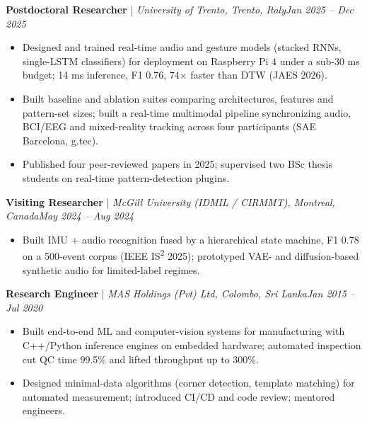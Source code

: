 \documentclass[11pt]{article}
\newenvironment{cvrole}[5]{%
  \par\noindent\textbf{\large #1} | \textit{\small #2, #3}\hfill \textit{\small #4 -- #5}\par
  \begin{itemize}[leftmargin=2em, itemsep=-0.3em, topsep=-0.5em]%
}{%
  \end{itemize}\par\noindent\mbox{}\par\vspace{0.1em}%
}
\begin{document}
\begin{cvrole}{Postdoctoral Researcher}{University of Trento}{Trento, Italy}{Jan 2025}{Dec 2025}
    \item Designed and trained real-time audio and gesture models (stacked RNNs, single-LSTM classifiers) for deployment on Raspberry Pi 4 under a sub-30 ms budget; 14 ms inference, F1 0.76, 74$\times$ faster than DTW (JAES 2026).
    \item Built baseline and ablation suites comparing architectures, features and pattern-set sizes; built a real-time multimodal pipeline synchronizing audio, BCI/EEG and mixed-reality tracking across four participants (SAE Barcelona, g.tec).
    \item Published four peer-reviewed papers in 2025; supervised two BSc thesis students on real-time pattern-detection plugins.
\end{cvrole}

\begin{cvrole}{Visiting Researcher}{McGill University (IDMIL / CIRMMT)}{Montreal, Canada}{May 2024}{Aug 2024}
    \item Built IMU + audio recognition fused by a hierarchical state machine, F1 0.78 on a 500-event corpus (IEEE IS\textsuperscript{2} 2025); prototyped VAE- and diffusion-based synthetic audio for limited-label regimes.
\end{cvrole}

\begin{cvrole}{Research Engineer}{MAS Holdings (Pvt) Ltd}{Colombo, Sri Lanka}{Jan 2015}{Jul 2020}
    \item Built end-to-end ML and computer-vision systems for manufacturing with C++/Python inference engines on embedded hardware; automated inspection cut QC time 99.5\% and lifted throughput up to 300\%.
    \item Designed minimal-data algorithms (corner detection, template matching) for automated measurement; introduced CI/CD and code review; mentored engineers.
\end{cvrole}

\enlargethispage{3\baselineskip}
\end{document}
